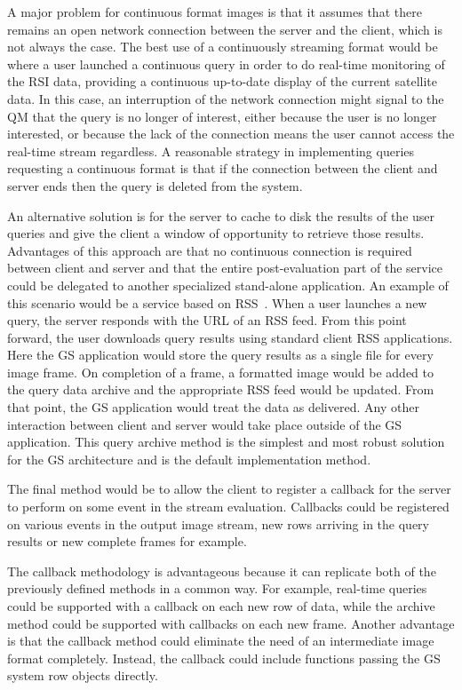 \documentclass{ucdthesis}       %
\begin{document}
A major problem for continuous format images is that it assumes that
there remains an open network connection between the server and the
client, which is not always the case.  The best use of a continuously
streaming format would be where a user launched a continuous query in
order to do real-time monitoring of the \ac{RSI} data, providing a
continuous up-to-date display of the current satellite data.  In this
case, an interruption of the network connection might signal to the
\ac{QM} that the query is no longer of interest, either because the
user is no longer interested, or because the lack of the connection
means the user cannot access the real-time stream regardless.  A
reasonable strategy in implementing queries requesting a continuous
format is that if the connection between the client and server ends
then the query is deleted from the system.

An alternative solution is for the server to cache to disk the results
of the user queries and give the client a window of opportunity to
retrieve those results.  Advantages of this approach are that no
continuous connection is required between client and server and that
the entire post-evaluation part of the service could be delegated to
another specialized stand-alone application.  An example of this
scenario would be a service based on \ac{RSS}~\cite{wiki06}.  When a
user launches a new query, the server responds with the \ac{URL} of an
\ac{RSS} feed.  From this point forward, the user downloads query
results using standard client \ac{RSS} applications.  Here the \ac{GS}
application would store the query results as a single file for every
image frame.  On completion of a frame, a formatted image would be
added to the query data archive and the appropriate \ac{RSS} feed
would be updated.  From that point, the \ac{GS} application would
treat the data as delivered.  Any other interaction between client and
server would take place outside of the \ac{GS} application.  This
query archive method is the simplest and most robust solution for the
\ac{GS} architecture and is the default implementation method.

The final method would be to allow the client to register a callback
for the server to perform on some event in the stream evaluation.
Callbacks could be registered on various events in the output image
stream, new rows arriving in the query results or new complete frames
for example.

The callback methodology is advantageous because it can replicate both
of the previously defined methods in a common way.  For example,
real-time queries could be supported with a callback on each new
row of data, while the archive method could be supported with
callbacks on each new frame.  Another advantage is that the
callback method could eliminate the need of an intermediate image
format completely.  Instead, the callback could include functions
passing the \ac{GS} system row objects directly.
\end{document}
